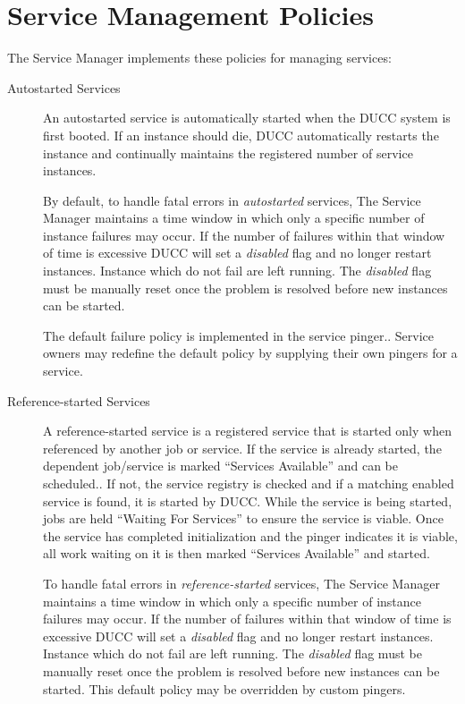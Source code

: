       \section{Service Management Policies}
      \label{sec:service.management-policy}

      The Service Manager implements these policies for managing services:
      \begin{description}

         \item[Autostarted Services] An autostarted service is automatically started when the DUCC
           system is first booted.  If an instance should die, DUCC automatically restarts the
           instance and continually maintains the registered number of service instances.

           By default, to handle fatal errors in {\em autostarted} services, The Service Manager maintains a time
           window in which only a specific number of instance failures may occur.  If the number of
           failures within that window of time is excessive DUCC will set a {\em disabled} flag and
           no longer restart instances.  Instance which do not fail are left running.  The {\em
             disabled} flag must be manually reset once the problem is resolved before new instances
           can be started.

           The default failure policy is implemented in the service pinger.. Service
           owners may redefine the default policy by supplying their own pingers for a service.
          
         \item[Reference-started Services] A reference-started service is a registered service that
           is started only when referenced by another job or service. If the service is already
           started, the dependent job/service is marked ``Services Available'' and can be scheduled.. If
           not, the service registry is checked and if a matching enabled service is found, it is 
           started by DUCC.  While the service is being started, jobs are held ``Waiting For Services''
           to ensure the service is viable. Once the service has completed initialization and the pinger 
           indicates it is viable, all work waiting on it is then marked ``Services Available'' and
           started.  
          
           To handle fatal errors in {\em reference-started} services, The Service Manager maintains
           a time window in which only a specific number of instance failures may occur.  If the
           number of failures within that window of time is excessive DUCC will set a {\em disabled}
           flag and no longer restart instances.  Instance which do not fail are left running. The
           {\em disabled} flag must be manually reset once the problem is resolved before new
           instances can be started.  This default policy may be overridden by custom pingers.
           

\end{description}
